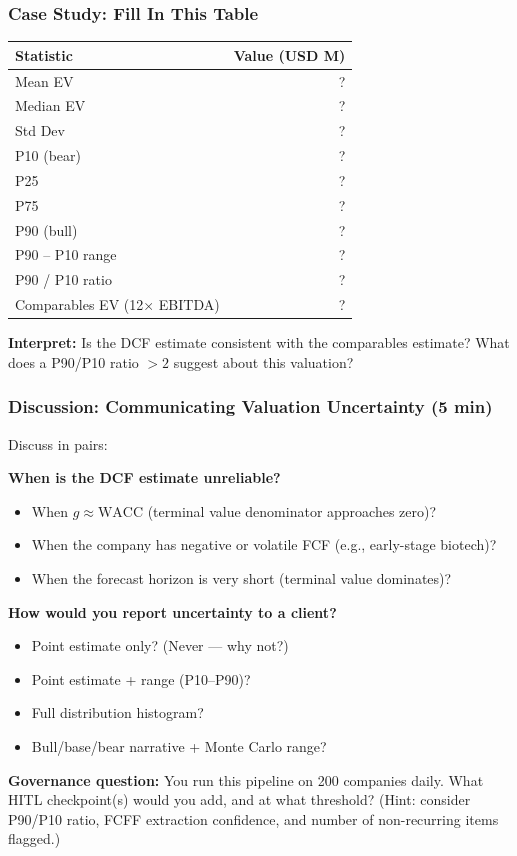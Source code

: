 \documentclass[9pt,t]{beamer}
\begin{document}
\begin{frame}
\frametitle{Case Study: Fill In This Table}

\begin{center}
\begin{tabular}{lr}
\toprule
\textbf{Statistic} & \textbf{Value (USD M)} \\
\midrule
Mean EV & ? \\
Median EV & ? \\
Std Dev & ? \\
P10 (bear) & ? \\
P25 & ? \\
P75 & ? \\
P90 (bull) & ? \\
\midrule
P90 -- P10 range & ? \\
P90 / P10 ratio & ? \\
\midrule
Comparables EV (12× EBITDA) & ? \\
\bottomrule
\end{tabular}
\end{center}

\medskip
\textbf{Interpret:} Is the DCF estimate consistent with the comparables estimate?
What does a P90/P10 ratio $> 2$ suggest about this valuation?
\end{frame}

\begin{frame}
\frametitle{Discussion: Communicating Valuation Uncertainty (5 min)}

Discuss in pairs:

\medskip
\textbf{When is the DCF estimate unreliable?}
\begin{itemize}
  \item When $g \approx \text{WACC}$ (terminal value denominator approaches zero)?
  \item When the company has negative or volatile FCF (e.g., early-stage biotech)?
  \item When the forecast horizon is very short (terminal value dominates)?
\end{itemize}

\medskip
\textbf{How would you report uncertainty to a client?}
\begin{itemize}
  \item Point estimate only? (Never --- why not?)
  \item Point estimate + range (P10--P90)?
  \item Full distribution histogram?
  \item Bull/base/bear narrative + Monte Carlo range?
\end{itemize}

\medskip
\textbf{Governance question:} You run this pipeline on 200 companies daily.
What HITL checkpoint(s) would you add, and at what threshold?
(Hint: consider P90/P10 ratio, FCFF extraction confidence, and number of non-recurring items flagged.)
\end{frame}
\end{document}
